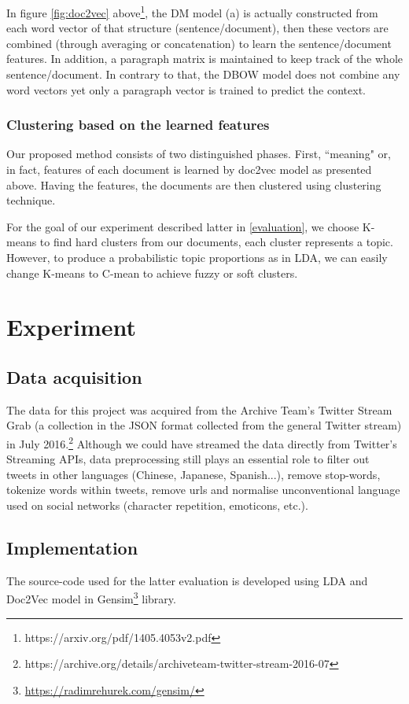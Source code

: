 \documentclass[11pt]{article}
\begin{document}
In figure \ref{fig:doc2vec} above\footnote{https://arxiv.org/pdf/1405.4053v2.pdf}, the DM model (a) is actually constructed from each word vector of that structure (sentence/document), then these vectors are combined (through averaging or concatenation) to learn the sentence/document features. In addition, a paragraph matrix is maintained to keep track of the whole sentence/document. In contrary to that, the DBOW model does not combine any word vectors yet only a paragraph vector is trained to predict the context.


\subsubsection{Clustering based on the learned features}
Our proposed method consists of two distinguished phases. First, ``meaning" or, in fact, features of each document is learned by doc2vec model as presented above. Having the features, the documents are then clustered using clustering technique. 

For the goal of our experiment described latter in \ref{evaluation}, we choose K-means to find hard clusters from our documents, each cluster represents a topic. However, to produce a probabilistic topic proportions as in LDA, we can easily change K-means to C-mean to achieve fuzzy or soft clusters.


\section{Experiment} \label{experiment}

\subsection{Data acquisition}
The data for this project was acquired from the Archive Team's Twitter Stream Grab (a collection in the JSON format collected from the general Twitter stream) in July 2016.\footnote{https://archive.org/details/archiveteam-twitter-stream-2016-07}  Although we could have streamed the data directly from Twitter's Streaming APIs, data preprocessing still plays an essential role to filter out tweets in other languages (Chinese, Japanese, Spanish...), remove stop-words, tokenize words within tweets, remove urls and normalise unconventional language used on social networks (character repetition, emoticons, etc.).

\subsection{Implementation}
The source-code used for the latter evaluation is developed using LDA and Doc2Vec model in Gensim\footnote{\url{https://radimrehurek.com/gensim/}} library.
\end{document}

